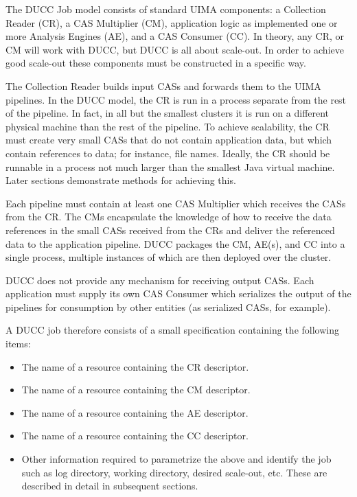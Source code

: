     The DUCC Job model consists of standard UIMA components: a Collection Reader (CR), a CAS
    Multiplier (CM), application logic as implemented one or more Analysis Engines (AE), and a CAS
    Consumer (CC).  In theory, any CR, or CM will work with DUCC, but DUCC is all about scale-out.  In
    order to achieve good scale-out these components must be constructed in a specific way.

    The Collection Reader builds input CASs and forwards them to the UIMA pipelines.  In the DUCC
    model, the CR is run in a process separate from the rest of the pipeline. In fact, in all but the
    smallest clusters it is run on a different physical machine than the rest of the pipeline.  To
    achieve scalability, the CR must create very small CASs that do not contain application data,
    but which contain references to data; for instance, file names.  Ideally, the CR should be
    runnable in a process not much larger than the smallest Java virtual machine.  Later sections
    demonstrate methods for achieving this.

    Each pipeline must contain at least one CAS Multiplier which receives the CASs from the CR.  The
    CMs encapsulate the knowledge of how to receive the data references in the small CASs received
    from the CRs and deliver the referenced data to the application pipeline.  DUCC packages the CM,
    AE(s), and CC into a single process, multiple instances of which are then deployed over the
    cluster.

    DUCC does not provide any mechanism for receiving output CASs.  Each application must
    supply its own CAS Consumer which serializes the output of the pipelines for 
    consumption by other entities (as serialized CASs, for example).

    A DUCC job therefore consists of a small specification containing the following items:
    
    \begin{itemize}
      \item The name of a resource containing the CR descriptor.
      \item The name of a resource containing the CM descriptor.
      \item The name of a resource containing the AE descriptor.
      \item The name of a resource containing the CC descriptor.
      \item Other information required to parametrize the above and identify the job
        such as log directory, working directory, desired scale-out, etc.  These are
        described in detail in subsequent sections.
    \end{itemize}

